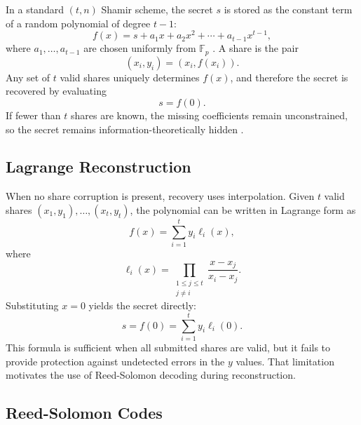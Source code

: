 In a standard $(t,n)$ Shamir scheme, the secret $s$ is stored as the constant term of a random polynomial of degree $t-1$:
\begin{equation}
f(x) = s + a_{1}x + a_{2}x^{2} + \cdots + a_{t-1}x^{t-1},
\label{eq:shamir}
\end{equation}
where $a_{1}, \ldots, a_{t-1}$ are chosen uniformly from $\mathbb{F}_{p}$ \cite{shamir1979}. A share is the pair
\begin{equation}
(x_{i}, y_{i}) = (x_{i}, f(x_{i})).
\label{eq:share}
\end{equation}
Any set of $t$ valid shares uniquely determines $f(x)$, and therefore the secret is recovered by evaluating
\begin{equation}
s = f(0).
\label{eq:secret}
\end{equation}
If fewer than $t$ shares are known, the missing coefficients remain unconstrained, so the secret remains information-theoretically hidden \cite{shamir1979}.

\subsection{Lagrange Reconstruction}

When no share corruption is present, recovery uses interpolation. Given $t$ valid shares $(x_{1},y_{1}), \ldots, (x_{t},y_{t})$, the polynomial can be written in Lagrange form as
\begin{equation}
f(x) = \sum_{i=1}^{t} y_{i}\ell_{i}(x),
\label{eq:lagrange_poly}
\end{equation}
where
\begin{equation}
\ell_{i}(x) = \prod_{\substack{1 \leq j \leq t \\ j \neq i}} \frac{x-x_{j}}{x_{i}-x_{j}}.
\label{eq:lagrange_basis}
\end{equation}
Substituting $x=0$ yields the secret directly:
\begin{equation}
s = f(0) = \sum_{i=1}^{t} y_{i}\ell_{i}(0).
\label{eq:lagrange_secret}
\end{equation}
This formula is sufficient when all submitted shares are valid, but it fails to provide protection against undetected errors in the $y$ values. That limitation motivates the use of Reed-Solomon decoding during reconstruction.

\subsection{Reed-Solomon Codes}


